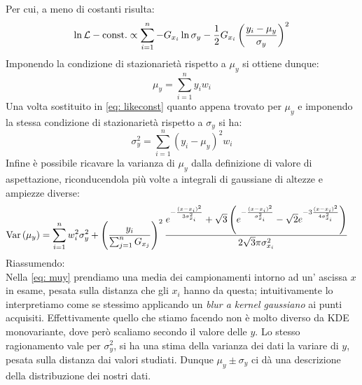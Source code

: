 \documentclass{article}[a4paper, oneside, 11pt]
\begin{document}
Per cui, a meno di costanti risulta:
\begin{equation}\label{eq: likeconst}
	\ln{\mathcal L} - \text{const.} \propto \sum_{i=1}^{n} -G_{x_i} \ln{\sigma_y}
	- \frac{1}{2} G_{x_i} \left( \frac{y_i - \mu_y}{\sigma_y} \right)^2
\end{equation}
Imponendo la condizione di stazionariet\`a rispetto a $\mu_y$ si ottiene dunque:
\begin{equation}\label{eq: muy}
	\mu_y = \sum_{i=1}^{n} y_i w_i 
\end{equation} 
Una volta sostituito in \eqref{eq: likeconst} quanto appena trovato per $\mu_y$
e imponendo la stessa condizione di stazionariet\`a rispetto a $\sigma_y$ si ha:
\begin{equation}\label{eq: sigmay}
	\sigma_y^2 = \sum_{i=1}^{n} (y_i - \mu_y)^2 w_i
\end{equation}
Infine \`e possibile ricavare la varianza di $\mu_y$ dalla definizione di
valore di aspettazione, riconducendola pi\`u volte a integrali di gaussiane
di altezze e ampiezze diverse:
\begin{align} \label{aln: varmuy}
	\text{Var}\left(\mu_y\right) &= \sum_{i=1}^{n} w_i^2 \sigma_y^2 + 
	\left(\frac{y_i}{\sum_{j=1}^{n} G_{x_j}} \right)^2 \frac{
	e^{-\frac{(x-x_i)^2}{3 \sigma_{x_i}^2}} +  
	\sqrt{3} \left( e^{-\frac{(x-x_i)^2}{\sigma_{x_i}^2}} -
	\sqrt{2} e^{-3 \frac{(x-x_i)^2}{4 \sigma_{x_i}^2}} \right)
	} {2 \sqrt{3}\pi \sigma_{x_i}^2} 
\end{align}
Riassumendo:\\
Nella \eqref{eq: muy} prendiamo una media dei campionamenti intorno ad un'
ascissa $x$ in esame, pesata sulla distanza che gli $x_i$ hanno da questa; 
intuitivamente lo interpretiamo come se stessimo applicando un 
\emph{blur a kernel gaussiano} ai punti acquisiti.
Effettivamente quello che stiamo facendo non \`e molto diverso da KDE monovariante,
dove per\`o scaliamo secondo il valore delle $y$.
Lo stesso ragionamento vale per $\sigma_y^2$, si ha una stima della varianza
dei dati la variare di $y$, pesata sulla distanza dai valori studiati. Dunque
$\mu_y \pm \sigma_y$ ci d\`a una descrizione della distribuzione dei nostri dati.

\end{document}
